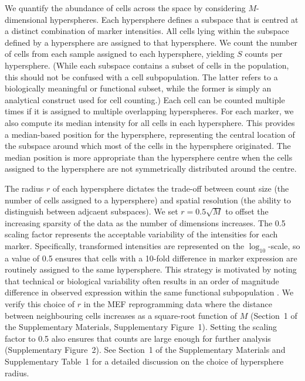 \documentclass{article}
\newcommand{\supphyperradverify}{1}
\newcommand{\suppfighyperrad}{1}
\newcommand{\suppfighypertol}{2}
\newcommand{\supptabparam}{1}
\begin{document}
We quantify the abundance of cells across the space by considering $M$-dimensional hyperspheres.
Each hypersphere defines a subspace that is centred at a distinct combination of marker intensities.
All cells lying within the subspace defined by a hypersphere are assigned to that hypersphere.
We count the number of cells from each sample assigned to each hypersphere, yielding $S$ counts per hypersphere.
(While each subspace contains a subset of cells in the population, this should not be confused with a cell subpopulation.
The latter refers to a biologically meaningful or functional subset, while the former is simply an analytical construct used for cell counting.)
Each cell can be counted multiple times if it is assigned to multiple overlapping hyperspheres.
For each marker, we also compute its median intensity for all cells in each hypersphere.
This provides a median-based position for the hypersphere, representing the central location of the subspace around which most of the cells in the hypersphere originated.
The median position is more appropriate than the hypersphere centre when the cells assigned to the hypersphere are not symmetrically distributed around the centre.


The radius $r$ of each hypersphere dictates the trade-off between count size (the number of cells assigned to a hypersphere) and spatial resolution (the ability to distinguish between adjcaent subspaces).
We set $r=0.5\sqrt{M}$ to offset the increasing sparsity of the data as the number of dimensions increases.
The 0.5 scaling factor represents the acceptable variability of the intensities for each marker.
Specifically, transformed intensities are represented on the $\log_{10}$-scale, so a value of 0.5 ensures that cells with a 10-fold difference in marker expression are routinely assigned to the same hypersphere.
This strategy is motivated by noting that technical or biological variability often results in an order of magnitude difference in observed expression within the same functional subpopulation \cite{ornatsky2008study,zunder2015continuous,zunder2015palladium}.
We verify this choice of $r$ in the MEF reprogramming data where the distance between neighbouring cells increases as a square-root function of $M$ (Section~\supphyperradverify{} of the Supplementary Materials, Supplementary Figure~\suppfighyperrad{}).
Setting the scaling factor to 0.5 also ensures that counts are large enough for further analysis (Supplementary Figure~\suppfighypertol{}).
See Section~\supphyperradverify{} of the Supplementary Materials and Supplementary Table~\supptabparam{} for a detailed discussion on the choice of hypersphere radius.
\end{document}
